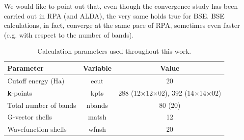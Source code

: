 \documentclass[aps,prb,10pt,superscriptaddress,notitlepage,endfloats]{revtex4-1}
\begin{document}
We would like to point out that, even though the convergence study has been
carried out in RPA (and ALDA), the very same holds true for BSE. BSE
calculations, in fact, converge at the same pace of RPA, sometimes even faster
(e.g. with respect to the number of bands).


\begin{table}
\caption{Calculation parameters used throughout this work.}
\label{tab:params}
\begin{ruledtabular}
\begin{tabular}{ l c c }
Parameter               & Variable  & Value \\
\hline
Cutoff energy (Ha)      & ecut      & 20 \\
\textbf{k}-points       & kpts      & 288 (12$\times$12$\times$02),
                                      392 (14$\times$14$\times$02) \\
Total number of bands   & nbands    & 80 (20) \\
G-vector shells         & matsh     & 12 \\
Wavefunction shells     & wfnsh     & 20
\end{tabular}
\end{ruledtabular}
\end{table}

\end{document}

